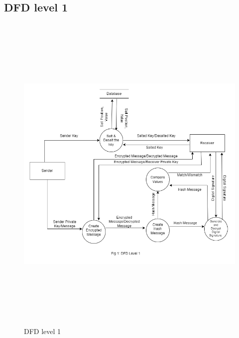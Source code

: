 \subsection{DFD level 1}
\begin{figure}[H]
	\centering
	\includegraphics[width=140mm, height=160mm]{images/dfd1.png}
	\caption{DFD level 1} %
	\label{figdfd1} %
\end{figure}

\pagebreak
